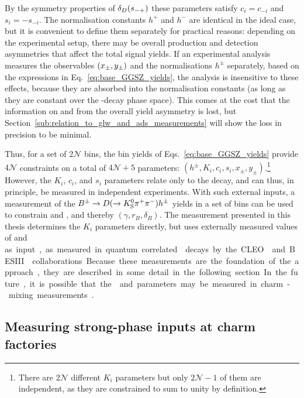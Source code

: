 By the symmetry properties of $\delta_D(s_{-+})$ these parameters satisfy ${c_i=c_{-i}}$ and ${s_i=-s_{-i}}$. The normalisation constants $h^+$ and $h^-$ are identical in the ideal case, but it is convenient to define them separately for practical reasons: depending on the experimental setup, there may be overall production and detection asymmetries that affect the total signal yields. If an experimental analysis measures the \CP observables $(x_\pm, y_\pm)$ and the normalisations $h^\pm$ separately, based on the expressions in Eq.~\eqref{eq:base_GGSZ_yields}, the analysis is insensitive to these effects, because they are absorbed into the normalisation constants (as long as they are constant over the \D-decay phase space). This comes at the cost that the information on \xpm and \ypm from the overall yield asymmetry is lost, but Section~\ref{sub:relation_to_glw_and_ads_measurements} will show the loss in precision to be minimal.

Thus, for a set of 2$\mathcal N$ bins, the bin yields of Eqs.~\eqref{eq:base_GGSZ_yields} provide $4\mathcal N$ constraints on a total of $4\mathcal N+5$  parameters: $(h^\pm, K_i, c_i, s_i, x_\pm, y_\pm)$.\footnote{There are $2\mathcal N$ different $K_i$ parameters but only $2\mathcal N -1$ of them are independent, as they are constrained to sum to unity by definition.} However, the $K_i$, $c_i$, and $s_i$ parameters relate only to the \D decay, and can thus, in principle, be measured in independent experiments. With such external inputs, a measurement of the ${{B}^\pm}\rightarrow D(\rightarrow{\ensuremath{{K}^0_{\mathrm{S}}}}{\ensuremath{{\pi}^+}}{\ensuremath{{\pi}^-}})h^\pm$ yields in a set of bins can be used to constrain \xpm and \ypm, and thereby $(\gamma, r_B, \delta_B)$. The measurement presented in this thesis determines the $K_i$ parameters directly, but uses externally measured values of \ci and \si as input, as measured in quantum correlated \D decays by the CLEO~\cite{CLEOCISI} and BESIII~\cite{BESCISI,BESCISIKSKK} collaborations. Because these measurements are the foundation of the approach, they are described in some detail in the following section. In the future, it is possible that the \ci and \si parameters may be measured in charm-mixing measurements~\cite{thomasModelindependentOverlineDMixing2012}.




\subsection{Measuring strong-phase inputs at charm factories} %
\label{sub:measuring_strong_phase_inputs_at_charm_factories}

